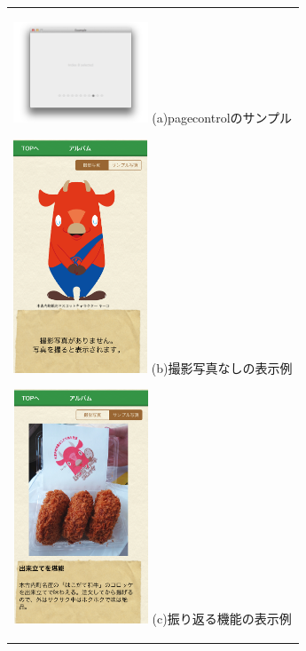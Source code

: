 \begin{figure}[htbp]
  \begin{center}
    \begin{tabular}{c}

      \begin{minipage}{0.33\hsize}
        \begin{center}
\includegraphics[width=4cm, bb=0 0 304 570]{pagecontrol.png}
          \hspace{1cm} (a)pagecontrolのサンプル
        \end{center}
      \end{minipage}

      \begin{minipage}{0.33\hsize}
        \begin{center}
\includegraphics[width=4cm, bb=0 0 304 570]{album1.png}
          \hspace{1cm} (b)撮影写真なしの表示例
        \end{center}
      \end{minipage}
      
      \begin{minipage}{0.33\hsize}
        \begin{center}
\includegraphics[width=4cm, bb=0 0 304 570]{album2.png}
          \hspace{1cm} (c)振り返る機能の表示例
        \end{center}
      \end{minipage}


\end{tabular}
\end{center}
\end{figure}
